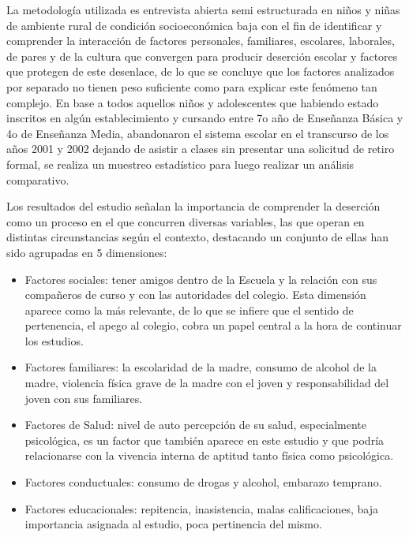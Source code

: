 La metodología utilizada es entrevista abierta semi estructurada en niños y niñas de ambiente rural de condición socioeconómica baja con el fin de identificar y comprender la interacción de factores personales, familiares, escolares, laborales, de pares y de la cultura que convergen para producir deserción escolar y factores que protegen de este desenlace, de lo que se concluye que los factores analizados por separado no tienen peso suficiente como para explicar este fenómeno tan complejo. En base a todos aquellos niños y adolescentes que habiendo estado inscritos en algún establecimiento y cursando entre 7o año de Enseñanza Básica y 4o de Enseñanza Media, abandonaron el sistema escolar en el transcurso de los años 2001 y 2002 dejando de asistir a clases sin presentar una solicitud de retiro formal, se realiza un muestreo estadístico para luego realizar un análisis comparativo. 

Los resultados del estudio señalan la importancia de comprender la deserción como un proceso en el que concurren diversas variables, las que operan en distintas circunstancias según el contexto, destacando un conjunto de ellas han sido agrupadas en 5 dimensiones:
\begin{itemize}
\item Factores sociales: tener amigos dentro de la Escuela y la relación con sus compañeros de curso y con las autoridades del colegio. Esta dimensión aparece como la más relevante, de lo que se infiere que el sentido de pertenencia, el apego al colegio, cobra un papel central a la hora de continuar los estudios.  
\item Factores familiares: la escolaridad de la madre, consumo de alcohol de la madre, violencia física grave de la madre con el joven y responsabilidad del joven con sus familiares.
\item Factores de Salud: nivel de auto percepción de su salud, especialmente psicológica, es un factor que también aparece en este estudio y que podría relacionarse con la vivencia interna de aptitud tanto física como psicológica.
\item Factores conductuales: consumo de drogas y alcohol, embarazo temprano.
\item Factores educacionales: repitencia, inasistencia, malas calificaciones, baja importancia asignada al estudio, poca pertinencia del mismo.
\end{itemize}

